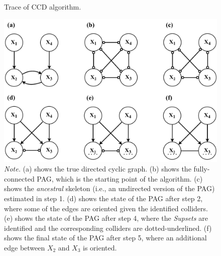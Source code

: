 \documentclass[twoside, 11pt]{article}
\makeatletter
\newcommand*{\indep}{%
  \mathbin{%
    \mathpalette{\@indep}{}%
  }%
}
\newcommand*{\@indep}[2]{%
  \sbox0{$#1\perp\m@th$}%
  \sbox2{$#1=$}%
  \sbox4{$#1\vcenter{}$}%
  \rlap{\copy0}%
  \dimen@=\dimexpr\ht2-\ht4-.2pt\relax
  \kern\dimen@
  \ifx\\#2\\%
  \else
    \hbox to \wd2{\hss$#1#2\m@th$\hss}%
    \kern-\wd2 %
  \fi
  \kern\dimen@
  \copy0 %
}
\newcommand{\udot}[1]{%
    \tikz[baseline=(todotted.base)]{
        \node[inner sep=1pt,outer sep=0pt] (todotted) {#1};
        \draw[dotted, thick] (todotted.south west) -- (todotted.south east);
    }%
}%
\newcommand{\tailarrow}{%
\begin{tikzpicture}
    \draw [-{Straight Barb[length=2.5pt]}](0,0) -- (0.4, 0);
\end{tikzpicture}
}
\newcommand{\arrowtail}{%
\begin{tikzpicture}
    \draw [{Straight Barb[length=2.5pt]}-](0,0) -- (0.4, 0);
\end{tikzpicture}
}
\newcommand*{\figref}[2][]{%
  \hyperref[{fig:#2}]{%
    Figure~\ref*{fig:#2}%
    \ifx\\#1\\%
    \else
      #1%
    \fi
  }%
}
\makeatother
\begin{document}



\begin{figure}[!t]
    \centering
        \caption{Trace of CCD algorithm.}
        \includegraphics[width=.7\textwidth]{figures/Fig5.pdf}
        \vspace{3mm}
        \caption*{\small{\textit{Note.} (a) shows the true directed cyclic graph. (b) shows the fully-connected PAG, which is the starting point of the algorithm. (c) shows the \textit{ancestral} skeleton (i.e., an undirected version of the PAG) estimated in step 1. (d) shows the state of the PAG after step 2, where some of the edges are oriented given the identified colliders. (e) shows the state of the PAG after step 4, where the \textit{Supsets} are identified and the corresponding colliders are dotted-underlined. (f) shows the final state of the PAG after step 5, where an additional edge between $X_2$ and $X_3$ is oriented.}}
    \label{fig:5}
\end{figure}
\end{document}
